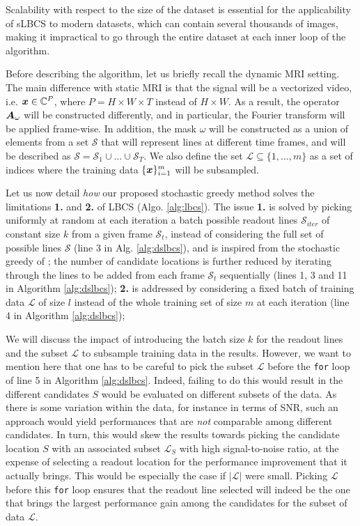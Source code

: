 Scalability with respect to the size of the dataset is essential for the applicability of sLBCS to modern datasets, which can contain several thousands of images, making it impractical to go through the entire dataset at each inner loop of the algorithm. 

Before describing the algorithm, let us briefly recall the dynamic MRI setting. The main difference with static MRI is that the signal will be a vectorized video, i.e. ${\bm{x}} \in \mathbb{C}^{P}$, where $P = H \times W \times T$ instead of $H \times W$. As a result, the operator ${\bm{A}}_\omega$ will be constructed differently, and in particular, the Fourier transform will be applied frame-wise. In addition, the mask $\omega$ will be constructed as a union of elements from a set $\mathcal{S}$ that will represent lines at different time frames, and will be described as $\mathcal{S}= \mathcal{S}_1 \cup \ldots \cup \mathcal{S}_T$. We also define the set $\mathcal{L} \subseteq \{1,\ldots,m\}$ as a set of indices where the training data $\{{\bm{x}}\}_{i=1}^m$ will be subsampled. 

Let us now detail \textit{how} our proposed stochastic greedy method solves the limitations \textbf{1.} and \textbf{2.} of LBCS (Algo. \ref{alg:lbcs}). The issue \textbf{1.} is solved by picking uniformly at random at each iteration a batch possible readout lines $\mathcal{S}_{iter}$ of constant size $k$ from a given frame $\mathcal{S}_t$, instead of considering the full set of possible lines $\mathcal{S}$ (line 3 in Alg. \ref{alg:dslbcs}), and is inspired from the stochastic greedy of \citet{mirzasoleiman2015lazier}; 
the number of candidate locations is further reduced by iterating through the lines to be added from each frame $\mathcal{S}_t$ sequentially (lines 1, 3 and 11 in Algorithm \ref{alg:dslbcs});
\textbf{2.} is addressed by considering a fixed batch of training data $\mathcal{L}$ of size $l$ instead of the whole training set of size $m$ at each iteration (line 4 in Algorithm \ref{alg:dslbcs}); 
\begin{remark}
    We will discuss the impact of introducing the batch size $k$ for the readout lines and the subset $\mathcal{L}$ to subsample training data in the results. However, we want to mention here that one has to be careful to pick the subset $\mathcal{L}$ before the \texttt{for} loop of line 5 in Algorithm \ref{alg:dslbcs}. Indeed, failing to do this would result in the different candidates $S$ would be evaluated on different subsets of the data. As there is some variation within the data, for instance in terms of SNR, such an approach would yield performances that are \textit{not} comparable among different candidates. In turn, this would skew the results towards picking the candidate location $S$ with an associated subset $\mathcal{L}_S$ with high signal-to-noise ratio, at the expense of selecting a readout location for the performance improvement that it actually brings. This would be especially the case if $|\mathcal{L}|$ were small. Picking $\mathcal{L}$ before this \texttt{for} loop ensures that the readout line selected will indeed be the one that brings the largest performance gain among the candidates for the subset of data $\mathcal{L}$.     
\end{remark}



